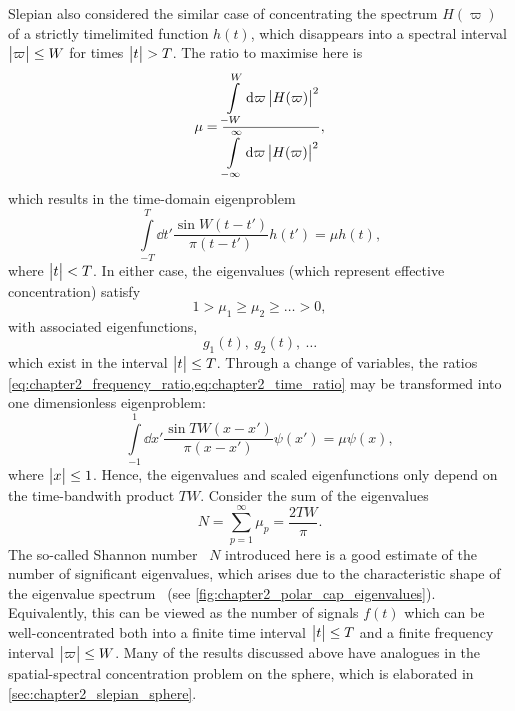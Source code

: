 Slepian \etal{} also considered the similar case of concentrating the spectrum \(H(\varpi)\) of a strictly timelimited function \(h(t)\), which disappears into a spectral interval \(\big\lvert\varpi\big\rvert \leq W\) for times \(\big\lvert t\big\rvert > T\).
The ratio to maximise here is
%
\begin{equation}\label{eq:chapter2_time_ratio}
	\mu
	= \frac{\displaystyle\int\limits_{-W}^{W} \dd{\varpi} \big\lvert H(\varpi)\big\rvert^{2}}
	{\displaystyle\int\limits_{-\infty}^{\infty} \dd{\varpi} \big\lvert H(\varpi)\big\rvert^{2}},
\end{equation}
%
which results in the time-domain eigenproblem
%
\begin{equation}\label{eq:chapter2_time_eigenproblem}
	\int\limits_{-T}^{T} \dd{t'} \frac{\sin{W(t-t')}}{\pi(t-t')} h(t')
	= \mu h(t),
\end{equation}
%
where \(\big\lvert t\big\rvert < T\).
In either case, the eigenvalues (which represent effective concentration) satisfy
%
\begin{equation}
	1 > \mu_{1} \geq \mu_{2} \geq \ldots > 0, %
\end{equation}
%
with associated eigenfunctions, \eg{}
%
\begin{equation}
	g_{1}(t),\ g_{2}(t),\ \ldots
\end{equation}
%
which exist in the interval \(\big\lvert t\big\rvert \leq T\).
Through a change of variables, the ratios \cref{eq:chapter2_frequency_ratio,eq:chapter2_time_ratio} may be transformed into one dimensionless eigenproblem:
%
\begin{equation}
	\int\limits_{-1}^{1} \dd{x'} \frac{\sin{TW(x-x')}}{\pi(x-x')} \psi(x')
	= \mu \psi(x),
\end{equation}
%
where \(\big\lvert x\big\rvert \leq 1\).
Hence, the eigenvalues and scaled eigenfunctions only depend on the time-bandwith product \(TW\).
Consider the sum of the eigenvalues
%
\begin{equation}
	N
	= \sum\limits_{p=1}^{\infty} \mu_{p}
	= \frac{2TW}{\pi}.
\end{equation}
%
The so-called Shannon number~\cite{Percival1993} \(N\) introduced here is a good estimate of the number of significant eigenvalues, which arises due to the characteristic shape of the eigenvalue spectrum~\cite{Landau1965,Slepian1965} (see \cref{fig:chapter2_polar_cap_eigenvalues}).
Equivalently, this can be viewed as the number of signals \(f(t)\) which can be well-concentrated both into a finite time interval \(\big\lvert t\big\rvert \leq T\) and a finite frequency interval \(\big\lvert\varpi\big\rvert \leq W\).
Many of the results discussed above have analogues in the spatial-spectral concentration problem on the sphere, which is elaborated in \cref{sec:chapter2_slepian_sphere}.

